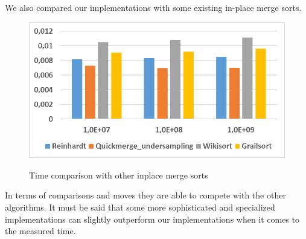 \documentclass[11pt,pdftex,a4paper, twocolumn]{article}
\begin{document}
We also compared our implementations with some existing in-place merge sorts. \\
\begin{figure}[H]
\includegraphics[width=\linewidth]{Diagramm-Bilder/time-other-inplace.JPG} \\
\caption{Time comparison with other inplace merge sorts} \label{fig:time-other-inplace}
\end{figure}
In terms of comparisons and moves they are able to compete with the other algorithms. It must be said that some more sophisticated and specialized implementations can slightly outperform our implementations when it comes to the measured time.



\end{document}
